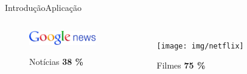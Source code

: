 \begin{frame}{Introdução}{Aplicação}
\begin{columns}[b]
\begin{figure}[ht]
    \begin{center}
    \includegraphics[height=23px]{img/google-news}

    Notícias \textbf{38 \%} \\
    \cite{das2007google}
    \end{center}
\end{figure}

\begin{figure}[ht]
    \begin{center}
    \texttt{[image: img/netflix]}

    Filmes \textbf{75 \%} \\
    \cite{netflix75}
    \end{center}
\end{figure}
\end{columns}
\end{frame}

